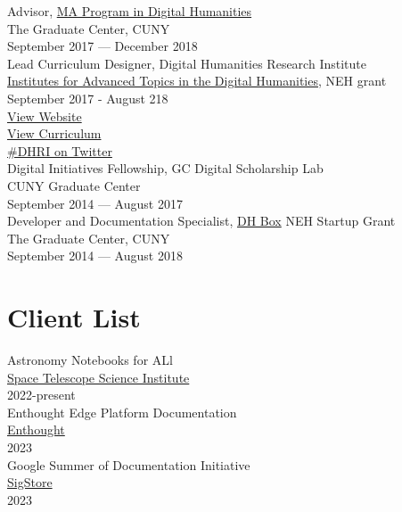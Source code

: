 \documentclass[11pt]{article}
\begin{document}
Advisor, \href{https://gc.cuny.edu/Page-Elements/Academics-Research-Centers-Initiatives/Masters-Programs/Digital-Humanities}{MA Program in Digital Humanities}\\
The Graduate Center, CUNY\\
September 2017 — December 2018\\

Lead Curriculum Designer, Digital Humanities Research Institute\\
\href{https://www.neh.gov/grants/odh/institutes-advanced-topics-in-the-digital-humanities}{Institutes for Advanced Topics in the Digital Humanities}, NEH grant\\
September 2017 - August 218\\
\href{http://dhinstitutes.org}{View Website}\\
\href{https://github.com/DHRI-Curriculum}{View Curriculum}\\
\href{https://twitter.com/search?q=\%2523dhri&src=tyah}{\#DHRI on Twitter}\\

Digital Initiatives Fellowship, GC Digital Scholarship Lab\\
CUNY Graduate Center\\
September 2014 — August 2017\\

Developer and Documentation Specialist, \href{https://dhbox.org/}{DH Box} NEH Startup Grant\\
The Graduate Center, CUNY\\
September 2014 — August 2018\\

\section*{Client List}
\label{sec:orgheadline3}
Astronomy Notebooks for ALl\\
\href{https://www.stsci.edu/}{Space Telescope Science Institute}\\
2022-present\\

Enthought Edge Platform Documentation\\
\href{https://www.enthought.com/}{Enthought}\\
2023\\

Google Summer of Documentation Initiative\\
\href{https://www.sigstore.dev/}{SigStore}\\
2023\\
\end{document}
